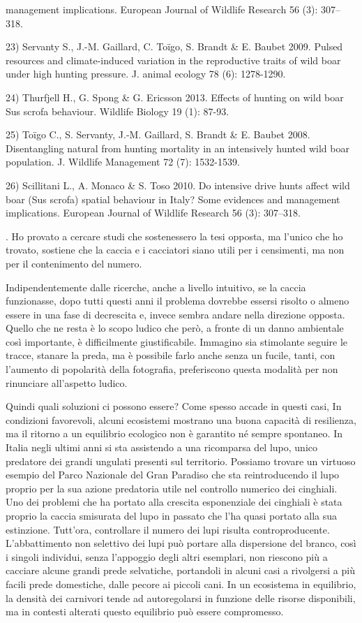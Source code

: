 \documentclass[12pt]{book} %
\begin{document}
\begin{mdframed}[linewidth=1pt]
{management implications. European Journal of Wildlife Research 56 (3): 307–318.\par 23) Servanty S., J.-M. Gaillard, C.
Toïgo, S. Brandt \& E. Baubet 2009. Pulsed resources and climate-induced variation in the reproductive traits of wild
boar under high hunting pressure. J. animal ecology 78 (6): 1278-1290.\par 24) Thurfjell H., G. Spong \& G. Ericsson
2013. Effects of hunting on wild boar Sus scrofa behaviour. Wildlife Biology 19 (1): 87-93.\par 25) Toïgo C., S.
Servanty, J.-M. Gaillard, S. Brandt \& E. Baubet 2008. Disentangling natural from hunting mortality in an intensively
hunted wild boar population. J. Wildlife Management 72 (7): 1532-1539.\par 26) Scillitani L., A. Monaco \& S. Toso
2010. Do intensive drive hunts affect wild boar (Sus scrofa) spatial behaviour in Italy? Some evidences and management
implications. European Journal of Wildlife Research 56 (3): 307–318. }. Ho provato a cercare studi che sostenessero la
tesi opposta, ma l'unico che ho trovato, sostiene che la caccia e i cacciatori siano utili per i censimenti, ma non per il contenimento del numero. 

Indipendentemente dalle ricerche, anche a livello intuitivo, se la caccia funzionasse, dopo tutti questi anni il
problema dovrebbe essersi risolto o almeno essere in una fase di decrescita e, invece sembra andare nella direzione opposta. 
Quello che ne resta è lo scopo ludico che però, a fronte di un danno
ambientale così importante, è difficilmente giustificabile. Immagino sia stimolante seguire le tracce, stanare la preda, ma è
possibile farlo anche senza un fucile, tanti, con l'aumento di popolarità della fotografia, preferiscono questa modalità per non rinunciare all'aspetto ludico.

Quindi quali soluzioni ci possono essere? Come spesso accade in questi casi, In condizioni favorevoli, alcuni ecosistemi mostrano una buona capacità di resilienza, ma il ritorno a un equilibrio ecologico non è garantito né sempre spontaneo. In Italia negli ultimi anni si sta assistendo a una ricomparsa del
lupo, unico predatore dei grandi ungulati presenti sul territorio. Possiamo trovare un virtuoso esempio del Parco
Nazionale del Gran Paradiso che sta reintroducendo il lupo proprio per la sua azione predatoria utile nel controllo
numerico dei cinghiali. Uno dei problemi che ha portato alla crescita esponenziale dei cinghiali è stata proprio la
caccia smisurata del lupo in passato che l'ha quasi portato alla sua estinzione.
Tutt'ora, controllare il numero dei lupi risulta controproducente. L’abbattimento non selettivo dei lupi può portare alla dispersione del branco, così i singoli individui, senza l'appoggio degli altri esemplari, non riescono più a cacciare alcune grandi prede selvatiche, portandoli in alcuni casi a rivolgersi a più facili prede domestiche, dalle
pecore ai piccoli cani. In un ecosistema in equilibrio, la densità dei carnivori tende ad autoregolarsi in funzione delle risorse disponibili, ma in contesti alterati questo equilibrio può essere compromesso.


\end{mdframed}
\end{document}
